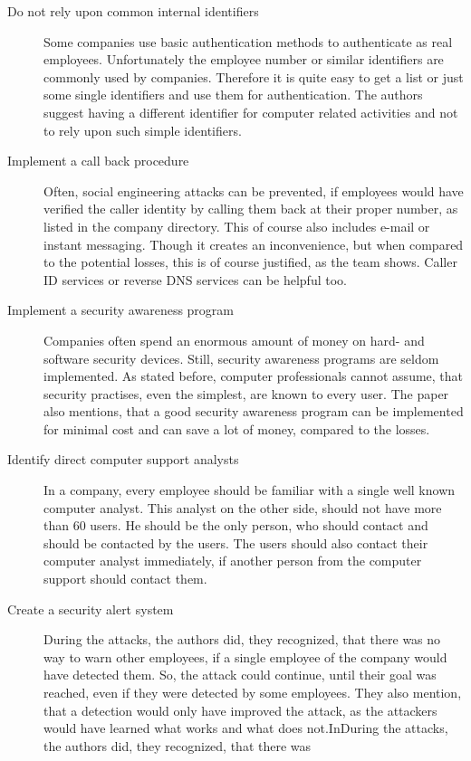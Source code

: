 \begin{description}
  \item[Do not rely upon common internal identifiers] Some companies use basic
  authentication methods to authenticate as real employees. Unfortunately the
  employee number or similar identifiers are commonly used by companies.
  Therefore it is quite easy to get a list or just some single identifiers and
  use them for authentication. The authors suggest having a different
  identifier for computer related activities and not to rely upon such simple
  identifiers.
  \item[Implement a call back procedure] Often, social engineering attacks can
  be prevented, if employees would have verified the caller identity by calling
  them back at their proper number, as listed in the company directory. This of
  course also includes e-mail or instant messaging. Though it creates an
  inconvenience, but when compared to the potential losses, this is of course
  justified, as the team shows. Caller ID services or reverse DNS services can
  be helpful too.
  \item[Implement a security awareness program] Companies often spend an
  enormous amount of money on hard- and software security devices. Still, security
  awareness programs are seldom implemented. As stated before, computer
  professionals cannot assume, that security practises, even the simplest, are
  known to every user. The paper also mentions, that a good security awareness
  program can be implemented for minimal cost and can save a lot of money,
  compared to the losses.
  \item[Identify direct computer support analysts] In a company, every employee
  should be familiar with a single well known computer analyst. This analyst on
  the other side, should not have more than 60 users. He should be the only
  person, who should contact and should be contacted by the users. The users
  should also contact their computer analyst immediately, if another person
  from the computer support should contact them.
  \item[Create a security alert system] During the attacks, the authors did,
  they recognized, that there was no way to warn other employees, if a single
  employee of the company would have detected them. So, the attack could
  continue, until their goal was reached, even if they were detected by some
  employees. They also mention, that a detection would only have improved the
  attack, as the attackers would have learned what works and what does
  not.InDuring the attacks, the authors did, they recognized, that there was

\end{description}
